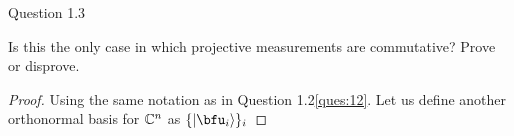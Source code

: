 \begin{solution}{Question 1.3}\label{ques:x}
    \begin{question}
    Is this the only case in which projective measurements are commutative? Prove or disprove.
    \end{question}
    \tcblower{}
    \begin{proof}
    Using the same notation as in Question 1.2\ref{ques:12}. Let us define another orthonormal basis for $\mathbb{C}^n$ as $\{\ket{\bfu_i}\}_i$ 
    \end{proof}
\end{solution}
